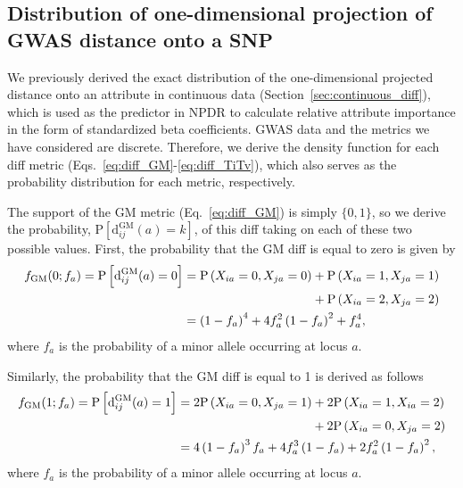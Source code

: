 \documentclass[10pt,letterpaper]{article}
\begin{document}
\subsection{Distribution of one-dimensional projection of GWAS distance onto a SNP}\label{sec:GWAS_diff}

We previously derived the exact distribution of the one-dimensional projected distance onto an attribute in continuous data (Section~\ref{sec:continuous_diff}), which is used as the predictor in NPDR to calculate relative attribute importance in the form of standardized beta coefficients. GWAS data and the metrics we have considered are discrete. Therefore, we derive the density function for each diff metric (Eqs.~\ref{eq:diff_GM}-\ref{eq:diff_TiTv}), which also serves as the probability distribution for each metric, respectively.

The support of the GM metric (Eq.~\ref{eq:diff_GM}) is simply $\{0,1\}$, so we derive the probability, $\text{P}\left[\text{d}^\text{GM}_{ij}(a) = k\right]$, of this diff taking on each of these two possible values. First, the probability that the GM diff is equal to zero is given by
%
\begin{equation}\label{eq:probGM0}
\begin{aligned}
f_\text{GM}(0;f_a) = \text{P}\left[\text{d}^\text{GM}_{ij}(a) = 0\right] &= \text{P}\left(X_{ia}=0,X_{ja}=0\right) + \text{P}\left(X_{ia}=1,X_{ja}=1\right) \\
& \hspace{3.64cm} + \text{P}\left(X_{ia}=2,X_{ja}=2\right) \\
&= \left(1 - f_a\right)^4 + 4 f^2_a \left(1 - f_a\right)^2 + f^4_a,
\end{aligned}
\end{equation}
%
where $f_a$ is the probability of a minor allele occurring at locus $a$.

Similarly, the probability that the GM diff is equal to 1 is derived as follows
%
\begin{equation}\label{eq:probGM1}
\begin{aligned}
f_\text{GM}(1;f_a) = \text{P}\left[\text{d}^\text{GM}_{ij}(a) = 1\right] &= 2\text{P}\left(X_{ia}=0,X_{ja}=1\right) + 2\text{P}\left(X_{ia}=1,X_{ia}=2\right) \\
& \hspace{3.81cm} + 2\text{P}\left(X_{ia}=0,X_{ja}=2\right) \\
&= 4\left(1 - f_a\right)^3 f_a + 4 f^3_a \left(1 - f_a\right) + 2 f^2_a \left(1 - f_a\right)^2,
\end{aligned}
\end{equation}
%
where $f_a$ is the probability of a minor allele occurring at locus $a$.
\end{document}
